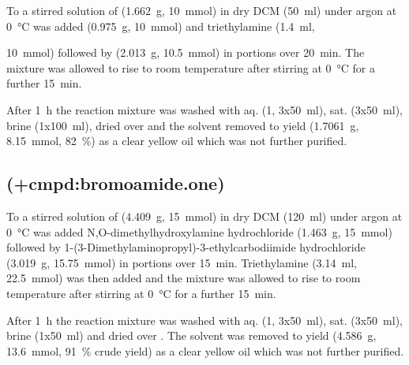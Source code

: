 To a stirred solution of  (\SI{1.662}{\gram}, \SI{10}{\milli\mol}) in dry DCM (\SI{50}{\milli\litre}) under argon at \SI{0}{\celsius} was added  (\SI{0.975}{\gram}, \SI{10}{\milli\mol}) and triethylamine (\SI{1.4}{\milli\litre}, {\SI{10}{\milli\mol}) followed by  (\SI{2.013}{\gram}, \SI{10.5}{\milli\mol}) in portions over \SI{20}{\minute}. The mixture was allowed to rise to room temperature after stirring at \SI{0}{\celsius} for a further \SI{15}{\minute}.

After \SI{1}{\hour} the reaction mixture was washed with aq.  (\SI{1}{\Molar}, 3x\SI{50}{\milli\litre}), sat.  (3x\SI{50}{\milli\litre}), brine (1x\SI{100}{\milli\litre}), dried over  and the solvent removed \invacuo to yield  (\SI{1.7061}{\gram}, \SI{8.15}{\milli\mole}, \SI{82}{\percent}) as a clear yellow oil which was not further purified.


\subsection{ (\cmpd+{cmpd:bromoamide.one})}

To a stirred solution of  (\SI{4.409}{\gram}, \SI{15}{\milli\mol}) in dry DCM (\SI{120}{\milli\litre}) under argon at \SI{0}{\celsius} was added N,O-dimethylhydroxylamine hydrochloride (\SI{1.463}{\gram}, \SI{15}{\milli\mol}) followed by 1-(3-Dimethylaminopropyl)-3-ethylcarbodiimide hydrochloride (\SI{3.019}{\gram}, \SI{15.75}{\milli\mol}) in portions over \SI{15}{\minute}. Triethylamine (\SI{3.14}{\milli\litre}, \SI{22.5}{\milli\mol}) was then added and the mixture was allowed to rise to room temperature after stirring at \SI{0}{\celsius} for a further \SI{15}{\minute}.

After \SI{1}{\hour} the reaction mixture was washed with aq.  (\SI{1}{\Molar}, 3x\SI{50}{\milli\litre}), sat.  (3x\SI{50}{\milli\litre}), brine (1x\SI{50}{\milli\litre}) and dried over . The solvent was removed \invacuo to yield  (\SI{4.586}{\gram}, \SI{13.6}{\milli\mol}, \SI{91}{\percent} crude yield) as a clear yellow oil which was not further purified.

}
